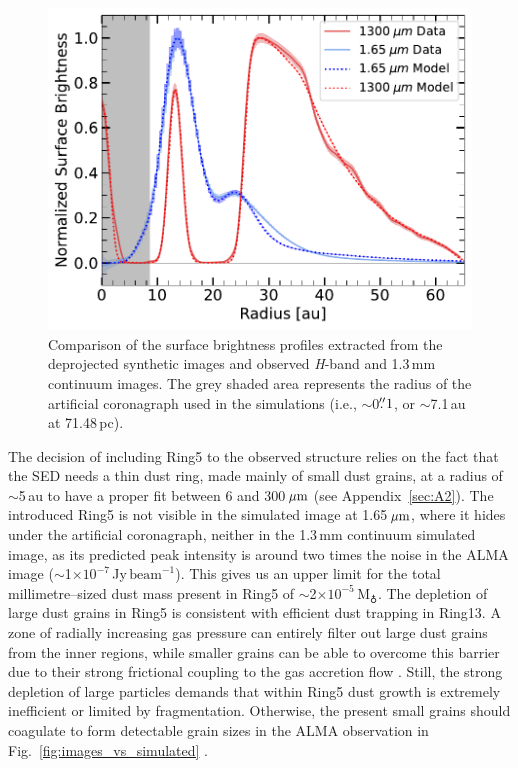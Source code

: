 \documentclass[fleqn,usenatbib,useAMS]{mnras}
\begin{document}
\begin{figure}
	\includegraphics[width=\columnwidth]{comp_fig_all_profiles_au.pdf}
    \caption{Comparison of the surface brightness profiles extracted from the deprojected synthetic images and observed \textit{H}-band and 1.3\,mm continuum images. The grey shaded area represents the radius of the artificial coronagraph used in the simulations (i.e., $\sim$0$\hbox{$.\!\!^{\prime\prime}$} 1$, or $\sim$7.1\,au at 71.48\,pc).}
    \label{fig:radprofiles}
\end{figure}

The decision of including Ring5 to the observed structure relies on the fact that the SED needs a thin dust ring, made mainly of small dust grains, at a radius of $\sim$5\,au to have a proper fit between 6 and 300\,$\hbox{$\mu$m}$ (see Appendix~\ref{sec:A2}). The introduced Ring5 is not visible in the simulated image at 1.65\,$\hbox{$\mu$m}$, where it hides under the artificial coronagraph, neither in the 1.3\,mm continuum simulated image, as its predicted peak intensity is around two times the noise in the ALMA image ($\sim$1$\times10^{-7}$\,Jy\,$\mathrm{beam}^{-1}$). This gives us an upper limit for the total millimetre--sized dust mass present in Ring5 of $\sim$2$\times10^{-5}$\,M$_{\earth}$. The depletion of large dust grains in Ring5 is consistent with efficient dust trapping in Ring13. A zone of radially increasing gas pressure can entirely filter out large dust grains from the inner regions, while smaller grains can be able to overcome this barrier due to their strong frictional coupling to the gas accretion flow \citep[studied in the context of planetary gaps,][]{Rice2006,Zhu2012,Weber2018}. Still, the strong depletion of large particles demands that within Ring5 dust growth is extremely inefficient or limited by fragmentation. Otherwise, the present small grains should coagulate to form detectable grain sizes in the ALMA observation in Fig.~\ref{fig:images_vs_simulated} \citep{Drazkowska2019}. 
\end{document}
